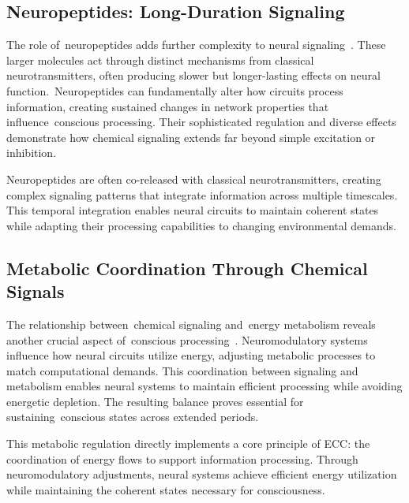 \subsection*{Neuropeptides: Long-Duration Signaling~}

The role of~neuropeptides adds further complexity to neural signaling~\cite{Nadim2014, Sudhof2018}. These larger molecules act through distinct mechanisms from classical neurotransmitters, often producing slower but longer-lasting effects on neural function.~Neuropeptides can fundamentally alter how circuits process information, creating sustained changes in network properties that influence~conscious processing. Their sophisticated regulation and diverse effects demonstrate how chemical signaling extends far beyond simple excitation or inhibition.

Neuropeptides are often co-released with classical neurotransmitters, creating complex signaling patterns that integrate information across multiple timescales. This temporal integration enables neural circuits to maintain coherent states while adapting their processing capabilities to changing environmental demands.

\subsection*{Metabolic Coordination Through Chemical Signals~}

The relationship between~chemical signaling and~energy metabolism reveals another crucial aspect of~conscious processing~\cite{Marder2012, Attwell2001}. Neuromodulatory systems influence how neural circuits utilize energy, adjusting metabolic processes to match computational demands. This coordination between signaling and metabolism enables neural systems to maintain efficient processing while avoiding energetic depletion. The resulting balance proves essential for sustaining~conscious states across extended periods.

This metabolic regulation directly implements a core principle of ECC: the coordination of energy flows to support information processing. Through neuromodulatory adjustments, neural systems achieve efficient energy utilization while maintaining the coherent states necessary for consciousness.

